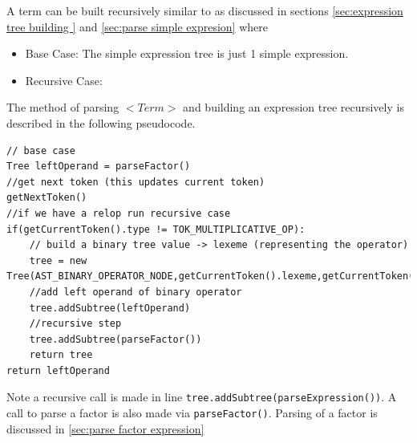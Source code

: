 A term  can be built recursively similar to as discussed in sections \ref{sec:expression tree building } and \ref{sec:parse simple expresion} where 
\begin{itemize}
    \item Base Case: The simple expression tree is just 1 simple expression.
   \begin{center}
   \end{center}
    \item Recursive Case:
    \begin{center}
    \end{center}

\end{itemize}



The method of parsing $<Term>$ and building an expression tree recursively is described in the following pseudocode.
\begin{lstlisting}[caption=parsing \emph{<Term>} and building an expression tree (\emph{parseTerm()})]
// base case
Tree leftOperand = parseFactor()
//get next token (this updates current token) 
getNextToken()
//if we have a relop run recursive case
if(getCurrentToken().type != TOK_MULTIPLICATIVE_OP):
    // build a binary tree value -> lexeme (representing the operator)
    tree = new Tree(AST_BINARY_OPERATOR_NODE,getCurrentToken().lexeme,getCurrentToken().lineNumber)
    //add left operand of binary operator
    tree.addSubtree(leftOperand)
    //recursive step
    tree.addSubtree(parseFactor())
    return tree
return leftOperand
\end{lstlisting}
Note a recursive call is made in line \verb!tree.addSubtree(parseExpression())!. A call to parse a factor is also made via \verb!parseFactor()!. Parsing of a factor is discussed in \ref{sec:parse factor expression}

